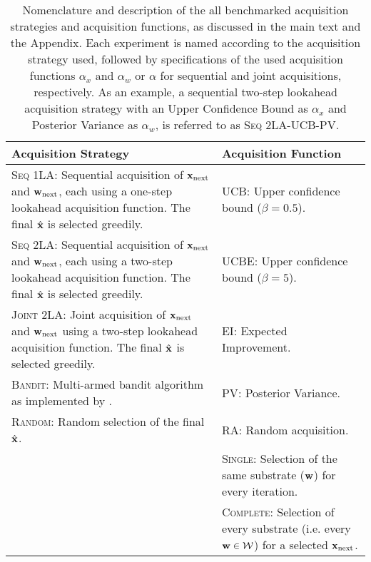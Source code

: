 \begin{table}[t]
    \footnotesize
    \centering
    \caption{
    Nomenclature and description of the all benchmarked acquisition strategies and acquisition functions, as discussed in the main text and the Appendix. Each experiment is named according to the acquisition strategy used, followed by specifications of the used acquisition functions $\alpha_x$ and $\alpha_w$ or $\alpha$ for sequential and joint acquisitions, respectively.
    As an example, a sequential two-step lookahead acquisition strategy with an Upper Confidence Bound as $\alpha_x$ and Posterior Variance as $\alpha_w$, is referred to as \textsc{Seq 2LA-UCB-PV}.
    }
    \renewcommand{\arraystretch}{1.3}

    \begin{tabularx}{\textwidth}{p{}|X}\toprule
        Acquisition Strategy & Acquisition Function \\ \midrule
        \textsc{Seq 1LA}: Sequential acquisition of ${\mathbf{x}}_\text{next}$ and  ${\mathbf{w}}_\text{next}$, each using a one-step lookahead acquisition function. The final $\hat{{\mathbf{x}}}$ is selected greedily. & \textsc{UCB}: Upper confidence bound ($\beta = 0.5$). \\
        \textsc{Seq 2LA}: Sequential acquisition of ${\mathbf{x}}_\text{next}$ and  ${\mathbf{w}}_\text{next}$, each using a two-step lookahead acquisition function. The final $\hat{{\mathbf{x}}}$ is selected greedily. & \textsc{UCBE}: Upper confidence bound ($\beta = 5$). \\
        \textsc{Joint 2LA}: Joint acquisition of ${\mathbf{x}}_\text{next}$ and  ${\mathbf{w}}_\text{next}$ using a two-step lookahead acquisition function. The final $\hat{{\mathbf{x}}}$ is selected greedily. & \textsc{EI}: Expected Improvement. \\
        \textsc{Bandit}: Multi-armed bandit algorithm as implemented by \citet{wang_identifying_2024}. & \textsc{PV}: Posterior Variance. \\
        \textsc{Random}: Random selection of the final $\hat{{\mathbf{x}}}$. & \textsc{RA}: Random acquisition.\\
         & \textsc{Single}: Selection of the same substrate (${\mathbf{w}}$) for every iteration. \\
          & \textsc{Complete}: Selection of every substrate (i.e. every ${\mathbf{w}} \in {\mathcal{W}}$) for a selected ${\mathbf{x}}_\text{next}$. \\
        \bottomrule
    \end{tabularx}
    \label{tab:acquisition_strategies_all}
\end{table}

